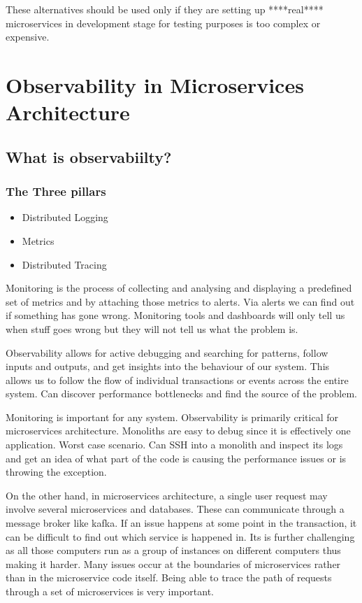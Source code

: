 \documentclass[a4paper, 11pt]{book}
\begin{document}
    These alternatives should be used only if they are setting up ****real**** microservices in development stage for testing purposes is too complex or expensive.

    \section{Observability in Microservices Architecture}

    \subsection{What is observabiilty?}

    \subsubsection{The Three pillars}

    \begin{itemize}
        \item Distributed Logging
        \item Metrics
        \item Distributed Tracing
    \end{itemize}

    Monitoring is the process of collecting and analysing and displaying a predefined set of metrics and by attaching those metrics to alerts.
    Via alerts we can find out if something has gone wrong.
    Monitoring tools and dashboards will only tell us when stuff goes wrong but they will not tell us what the problem is.

    Observability allows for active debugging and searching for patterns, follow inputs and outputs, and get insights into the behaviour of our system.
    This allows us to follow the flow of individual transactions or events across the entire system.
    Can discover performance bottlenecks and find the source of the problem.

    Monitoring is important for any system.
    Observability is primarily critical for microservices architecture.
    Monoliths are easy to debug since it is effectively one application.
    Worst case scenario.
    Can SSH into a monolith and inspect its logs and get an idea of what part of the code is causing the performance issues or is throwing the exception.

    On the other hand, in microservices architecture, a single user request may involve several microservices and databases.
    These can communicate through a message broker like kafka.
    If an issue happens at some point in the transaction, it can be difficult to find out which service is happened in.
    Its is further challenging as all those computers run as a group of instances on different computers thus making it harder.
    Many issues occur at the boundaries of microservices rather than in the microservice code itself.
    Being able to trace the path of requests through a set of microservices is very important.
\end{document}
